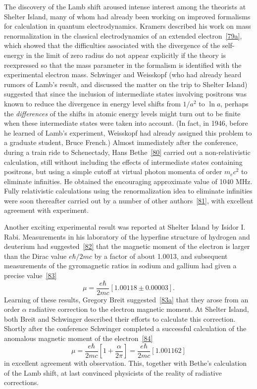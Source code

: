 The discovery of the Lamb shift aroused intense interest among the theorists at Shelter Island, many of whom had already been working on improved formalisms for calculation in quantum electrodynamics. Kramers described his work on mass renormalization in the classical electrodynamics of an extended electron~\hyperref[ref:1.79a]{[79a]}, which showed that the difficulties associated with the divergence of the self-energy in the limit of zero radius do not appear explicitly if the theory is reexpressed so that the mass parameter in the formalism is identified with the experimental electron mass. Schwinger and Weisskopf (who had already heard rumors of Lamb's result, and discussed the matter on the trip to Shelter Island) suggested that since the inclusion of intermediate states involving positrons was known to reduce the divergence in energy level shifts from $1/a^2$ to $\ln a$, perhaps the \emph{differences} of the shifts in atomic energy levels might turn out to be finite when these intermediate states were taken into account. (In fact, in 1946, before he learned of Lamb's experiment, Weisskopf had already assigned this problem to a graduate student, Bruce French.) Almost immediately after the conference, during a train ride to Schenectady, Hans Bethe~\hyperref[ref:1.80]{[80]} carried out a non-relativistic calculation, still without including the effects of intermediate states containing positrons, but using a simple cutoff at virtual photon momenta of order $m_ec^2$ to eliminate infinities. He obtained the encouraging approximate value of 1040 MHz. Fully relativistic calculations using the renormalization idea to eliminate infinities were soon thereafter carried out by a number of other authors~\hyperref[ref:1.81]{[81]}, with excellent agreement with experiment.

Another exciting experimental result was reported at Shelter Island by Isidor I. Rabi. Measurements in his laboratory of the hyperfine structure of hydrogen and deuterium had suggested~\hyperref[ref:1.82]{[82]} that the magnetic moment of the electron is larger than the Dirac value $e\hbar/2mc$ by a factor of about 1.0013, and subsequent measurements of the gyromagnetic ratios in sodium and gallium had given a precise value~\hyperref[ref:1.83]{[83]}
\[
  \mu=\frac{e\hbar}{2mc}[1.00118\pm0.00003].
\]
Learning of these results, Gregory Breit suggested~\hyperref[ref:1.83a]{[83a]} that they arose from an order $\alpha$ radiative correction to the electron magnetic moment. At Shelter Island, both Breit and Schwinger described their efforts to calculate this correction. Shortly after the conference Schwinger completed a successful calculation of the anomalous magnetic moment of the electron~\hyperref[ref:1.84]{[84]}
\[
  \mu=\frac{e\hbar}{2mc}\left[1+\frac{\alpha}{2\pi}\right]
  =\frac{e\hbar}{2mc}[1.001162]
\]
in excellent agreement with observation. This, together with Bethe's calculation of the Lamb shift, at last convinced physicists of the reality of radiative corrections.

